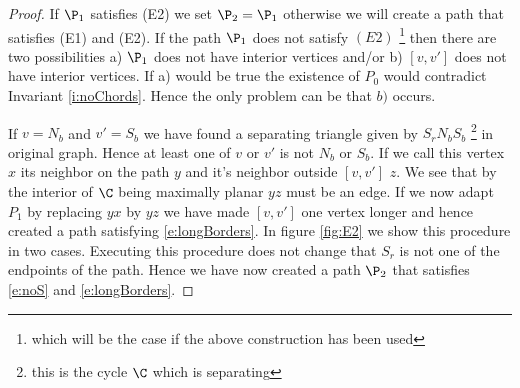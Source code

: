 \begin{proof}
If $\P_1$ satisfies (E2) we set $\P_2 = \P_1$ otherwise we will create a path that satisfies (E1) and (E2).
If the path $\P_1$ does not satisfy $(E2)$ \footnote{which will be the case if the above construction has been used} then there are two possibilities  a) $\P_1$ does not have interior vertices and/or b) $[v,v']$ does not have interior vertices. If a) would be true the existence of $P_0$ would contradict Invariant \ref{i:noChords}. Hence the only problem can be that $b)$ occurs.

If $v=N_b$ and $v'=S_b$ we have found a separating triangle given by $S_rN_bS_b$ \footnote{this is the cycle $\C$ which is separating} in original graph. Hence at least one of $v$ or $v'$ is not $N_b$ or $S_b$. If we call this vertex $x$ its neighbor on the path $y$ and it's neighbor outside $[v,v']$ $z$. We see that by the interior of $\C$ being maximally planar $yz$ must be an edge. If we now adapt $P_1$ by replacing $yx$ by $yz$ we have made $[v,v']$ one vertex longer and hence created a path satisfying \ref{e:longBorders}. In figure \ref{fig:E2} we show this procedure in two cases. Executing this procedure does not change that $S_r$ is not one of the endpoints of the path. Hence we have now created a path $\P_2$ that satisfies \ref{e:noS} and \ref{e:longBorders}.


\end{proof}
